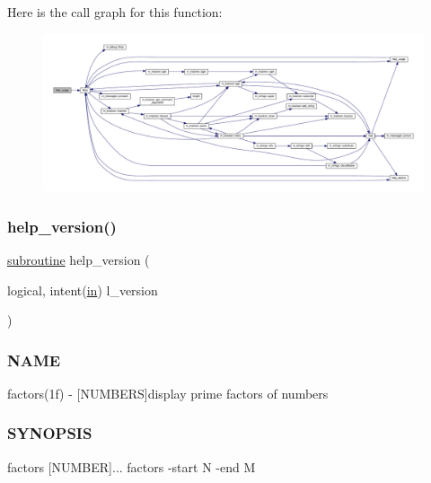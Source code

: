 Here is the call graph for this function\+:
\nopagebreak
\begin{figure}[H]
\begin{center}
\leavevmode
\includegraphics[width=350pt]{factors_8f90_a3e09a3b52ee8fb04eeb93fe5761626a8_cgraph}
\end{center}
\end{figure}
\mbox{\label{factors_8f90_a39c21619b08a3c22f19e2306efd7f766}} 
\subsubsection{\texorpdfstring{help\+\_\+version()}{help\_version()}}
{\footnotesize\ttfamily \hyperlink{M__stopwatch_83_8txt_acfbcff50169d691ff02d4a123ed70482}{subroutine} help\+\_\+version (\begin{DoxyParamCaption}\item[{logical, intent(\hyperlink{M__journal_83_8txt_afce72651d1eed785a2132bee863b2f38}{in})}]{l\+\_\+version }\end{DoxyParamCaption})}



\subsubsection*{N\+A\+ME}

factors(1f) -\/ \mbox{[}N\+U\+M\+B\+E\+RS\mbox{]}display prime factors of numbers 

\subsubsection*{S\+Y\+N\+O\+P\+S\+IS}

\begin{DoxyVerb}    factors [NUMBER]...
    factors -start N -end M
\end{DoxyVerb}


